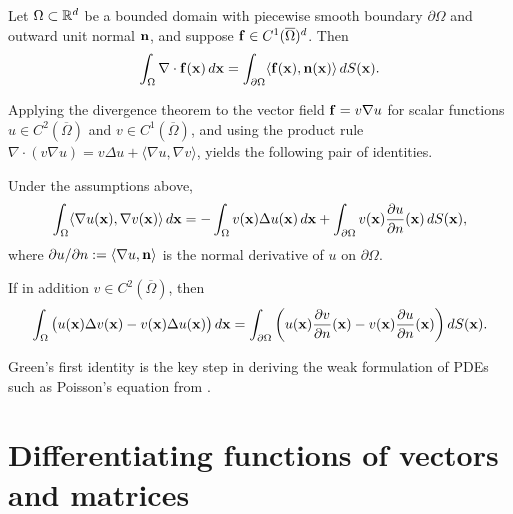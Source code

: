 \begin{theorem}
    Let $\Omega \subset \mathbb{R}^d$ be a bounded domain with piecewise smooth
    boundary $\partial \Omega$ and outward unit normal $\mathbf{n}$, and
    suppose $\mathbf{f} \in C^1(\overline\Omega)^d$. Then
    \begin{equation*}
        \int_\Omega \nabla \cdot \mathbf{f}(\mathbf{x}) \, d\mathbf{x} =
        \int_{\partial \Omega} \langle \mathbf{f}(\mathbf{x}), \mathbf{n}(\mathbf{x}) \rangle \, dS(\mathbf{x}).
    \end{equation*}
\end{theorem}
Applying the divergence theorem to the vector field $\mathbf{f} = v \nabla u$
for scalar functions $u \in C^2(\overline\Omega)$ and $v \in
C^1(\overline\Omega)$, and using the product rule $\nabla \cdot (v
\nabla u) = v \Delta u + \langle \nabla u, \nabla v \rangle$, yields the
following pair of identities.

\begin{corollary}
    \label{cor:greens-first-identity}
    Under the assumptions above,
    \begin{equation*}
        \int_\Omega \langle \nabla u(\mathbf{x}), \nabla v(\mathbf{x}) \rangle \, d\mathbf{x}
        = - \int_\Omega v(\mathbf{x}) \Delta u(\mathbf{x}) \, d\mathbf{x} +
        \int_{\partial \Omega} v(\mathbf{x}) \frac{\partial u}{\partial n}(\mathbf{x})
        \, dS(\mathbf{x}),
    \end{equation*}
    where $\partial u/\partial n := \langle \nabla u, \mathbf{n} \rangle$
    is the normal derivative of $u$ on $\partial \Omega$.
\end{corollary}

\begin{corollary}
    If in addition $v \in C^2(\overline\Omega)$, then
    \begin{equation*}
        \int_\Omega \big( u(\mathbf{x}) \Delta v(\mathbf{x}) - v(\mathbf{x}) \Delta u(\mathbf{x})
        \big) \, d\mathbf{x} =
        \int_{\partial \Omega} \left(
            u(\mathbf{x}) \frac{\partial v}{\partial n}(\mathbf{x}) -
            v(\mathbf{x}) \frac{\partial u}{\partial n}(\mathbf{x})
        \right) dS(\mathbf{x}).
    \end{equation*}
\end{corollary}
Green's first identity is the key step in deriving the weak formulation
of PDEs such as Poisson's equation from .


\section{Differentiating functions of vectors and matrices}

